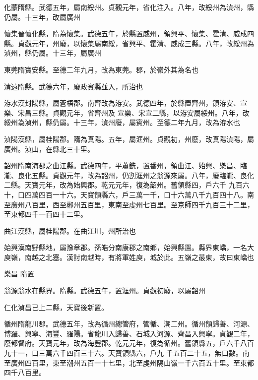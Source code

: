 \begin{pinyinscope}
 化蒙隋縣。武德五年，屬南綏州。貞觀元年，省化注入。八年，改綏州為湞州，縣
 仍屬。十三年，改屬廣州



 懷集晉懷化縣，隋為懷集。武德五年，於縣置威州，領興平、懷集、霍清、威成四縣。貞觀元年，州廢，以懷集屬南綏，省興平、霍清、威成三縣。八年，改綏州為湞州，縣仍屬。十三年，屬廣州



 東莞隋寶安縣。至德二年九月，改為東莞。郡，於嶺外其為名也



 清遠隋縣。武德六年，廢政賓縣並入，所治也



 洊水漢封陽縣，屬蒼梧郡。南齊改為洊安。武德四年，於縣置齊州，領洊安、宣樂、宋昌三縣。貞觀元年，省齊州及
 宣樂、宋宣二縣，以洊安屬綏州。八年，改綏州為湞州，縣仍屬。十三年，湞州廢，屬賓州。至德二年九月，改為洊水也



 湞陽漢縣，屬桂陽郡。隋為真陽。五年，屬洭州。貞觀初，州廢，改真陽湞陽，屬廣州。湞山，在縣北三十里。



 韶州隋南海郡之曲江縣。武德四年，平蕭銑，置番州，領曲江、始興、樂昌、臨瀧、良化五縣。貞觀元年，改為韶州，仍割洭州之翁源來屬。八年，廢臨瀧、良化二縣。天寶元年，改為始興郡。乾元元年，復為韶州。舊領縣四，戶六千
 九百六十，口四萬四百一十六。天寶領縣六，戶三萬一千，口十六萬八千九百四十八。南至廣州八百里，西至郴州五百里，東南至虔州七百里。至京師四千九百三十二里，至東都四千一百四十二里。



 曲江漢縣，屬桂陽郡。在曲江川，州所治也



 始興漢南野縣地，屬豫章郡。孫皓分南康郡之南鄉，始興縣置。縣界東嶠，一名大庾嶺，南越之北塞。漢討南越時，有將軍姓庾，城於此。五嶺之最東，故曰東嶠也



 樂昌
 隋置



 翁源翁水在縣界。隋縣。武德五年，置洭州。貞觀初廢，以屬韶州



 仁化湞昌已上二縣，天寶後新置。



 循州隋龍川郡。武德五年，改為循州總管府，管循、潮二州。循州領歸善、河源、博羅、興寧、海豐、羅陽。省龍川入歸善、石城入河源、齊昌入興寧。貞觀二年，廢都督府。天寶元年，改為海豐郡。乾元元年，復為循州。舊領縣五，戶六千八百九十一，口三萬六千四百三十六。天寶領縣六，戶九
 千五百二十五，無口數。南至廣州四百里，東至潮州五百一十七里，北至虔州隔山嶺一千六百五十里。至東都四千八百里。




\end{pinyinscope}
